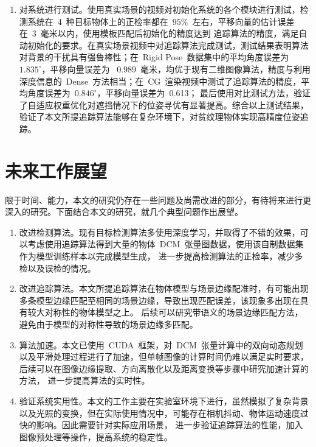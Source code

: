 \begin{enumerate}
    \item 对系统进行测试。使用真实场景的视频对初始化系统的各个模块进行测试，检测系统在~4~种目标物体上的正检率都在~$95\%$~左右，平移向量的估计误差在~3~毫米以内，使用模板匹配后初始化的精度达到
    追踪算法的精度，满足自动初始化的要求。在真实场景视频中对追踪算法完成测试，测试结果表明算法对背景的干扰具有强鲁棒性；在~Rigid Pose~数据集中的平均角度误差为~$1.835^\circ$，平移向量误差为
    ~$0.989$~毫米，均优于现有二维图像算法，精度与利用深度信息的~Dense~方法相当；在~CG~渲染视频中测试了追踪算法的精度，平均角度误差为~$0.846^\circ$，平移向量误差为~0.613；
    最后使用对比测试方法，验证了自适应权重优化对遮挡情况下的位姿寻优有显著提高。综合以上测试结果，验证了本文所提追踪算法能够在复杂环境下，对贫纹理物体实现高精度位姿追踪。
    \end{enumerate}

\section{未来工作展望}
限于时间、能力，本文的研究仍存在一些问题及尚需改进的部分，有待将来进行更深入的研究。下面结合本文的研究，就几个典型问题作出展望。
\begin{enumerate}
    \item 改进检测算法。现有目标检测算法多使用深度学习，并取得了不错的效果，可以考虑使用追踪算法得到大量的物体~DCM~张量图数据，使用该自制数据集作为模型训练样本以完成模型生成，
    进一步提高检测算法的正检率，减少多检以及误检的情况。
    \item 改进追踪算法。本文所提追踪算法在物体模型与场景边缘配准时，有可能出现多条模型边缘匹配至相同的场景边缘，导致出现匹配误差，该现象多出现在具有较大对称性的物体模型之上。
    后续可以研究带语义的场景边缘匹配方法，避免由于模型的对称性导致的场景边缘多匹配。
    \item 算法加速。本文已使用~CUDA~框架，对~DCM~张量计算中的双向动态规划以及平滑处理过程进行了加速，但单帧图像的计算时间仍难以满足实时要求，后续可以在图像边缘提取、方向离散化以及距离变换等步骤中研究加速计算的方法，
    进一步提高算法的实时性。
    \item 验证系统实用性。本文的工作主要在实验室环境下进行，虽然模拟了复杂背景以及光照的变换，但在实际使用情况中，可能存在相机抖动、物体运动速度过快的影响。因此需要针对实际应用场景，
    进一步验证追踪算法的性能，加入图像预处理等操作，提高系统的稳定性。
    \end{enumerate}
